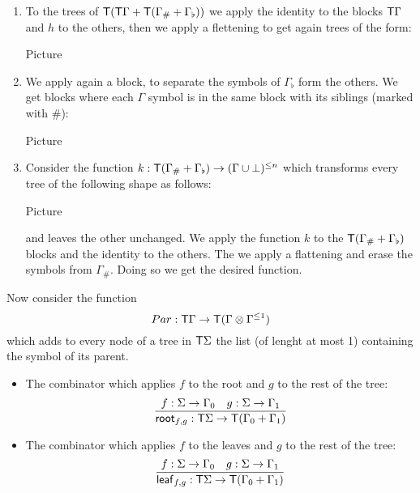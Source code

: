 \begin{example}
\begin{enumerate}
\item To the trees of $\mathsf T(\mathsf T\Gamma+\mathsf T(\Gamma_\#+\Gamma_\flat))$ we apply the identity to the blocks $\mathsf T \Gamma$ and $h$ to the others, then we apply a flettening to get again trees of the form:
\begin{center}
Picture
\end{center} 
\item We apply again a block, to separate the symbols of $\Gamma_\flat$ form the others. We get blocks where each $\Gamma$ symbol is in the same block with its siblings (marked with $\#$):
\begin{center}
Picture
\end{center}
\item Consider the function $k:\mathsf T(\Gamma_\#+\Gamma_\flat)\to (\Gamma\cup\bot)^{\leq n}$ which transforms every tree of the following shape as follows:
\begin{center}
Picture
\end{center}
and leaves the other unchanged. We apply the function $k$ to the $\mathsf T(\Gamma_\#+\Gamma_\flat)$
blocks and the identity to the others. The we apply a flattening and erase the symbols from $\Gamma_\#$. Doing so we get the desired function.
\end{enumerate}
\medskip

Now consider the function $$Par:\mathsf T\Gamma\to \mathsf T (\Gamma\otimes \Gamma^{\leq 1})$$ which adds to every node of a tree in $\mathsf T \Sigma$ the list (of lenght at most 1) containing the symbol of its parent.
\end{example}



\bigskip
\noindent  \begin{example}
\begin{itemize}
\item The combinator which applies $f$ to the root and $g$ to the rest of the tree:
\begin{align*}
    \frac{f : \Sigma \to \Gamma_0 \quad g : \Sigma \to \Gamma_1}
     {\mathsf{root}_{f,g} : \mathsf T\Sigma \to \mathsf T(\Gamma_0 + \Gamma_1)}
\end{align*}
\item The combinator which applies $f$ to the leaves and $g$ to the rest of the tree:
\begin{align*}
    \frac{f : \Sigma \to \Gamma_0 \quad g : \Sigma \to \Gamma_1}
     {\mathsf{leaf}_{f,g} : \mathsf T\Sigma \to \mathsf T(\Gamma_0 + \Gamma_1)}
\end{align*}
\end{itemize}
\end{example}

